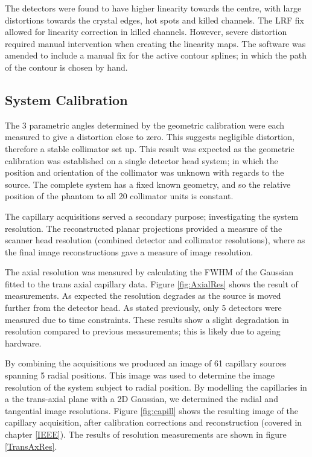 The detectors were found to have higher linearity towards the centre, with large distortions towards the crystal edges, hot spots and killed channels. The \acrshort{LRF} fix allowed for linearity correction in killed channels. However, severe distortion required manual intervention when creating the linearity maps. The software was amended to include a manual fix for the active contour splines; in which the path of the contour is chosen by hand. 

\subsection{System Calibration}
The 3 parametric angles determined by the geometric calibration were each measured to give a distortion close to zero. This suggests negligible distortion, therefore a stable collimator set up. This result was expected as the geometric calibration was established on a single detector head system; in which the position and orientation of the collimator was unknown with regards to the source. The complete system has a fixed known geometry, and so the relative position of the phantom to all 20 collimator units is constant. 

The capillary acquisitions served a secondary purpose; investigating the system resolution. The reconstructed planar projections provided a measure of the scanner head resolution (combined detector and collimator resolutions), where as the final image reconstructions gave a measure of image resolution. 

The axial resolution was measured by calculating the \acrshort{FWHM} of the Gaussian fitted to the trans axial capillary data. Figure \ref{fig:AxialRes} shows the result of measurements. As expected the resolution degrades as the source is moved further from the detector head. As stated previously, only 5 detectors were measured due to time constraints. These results show a slight degradation in resolution compared to previous measurements; this is likely due to ageing hardware. 

By combining the acquisitions we produced an image of 61 capillary
sources spanning 5 radial positions. This image was used to
determine the image resolution of the system subject to radial
position. By modelling the capillaries in a the trans-axial plane
with a 2D Gaussian, we determined the radial and tangential
image resolutions. Figure \ref{fig:capill} shows the resulting image of the capillary acquisition, after calibration corrections and reconstruction (covered in chapter \ref{IEEE}). The results of resolution measurements are shown in figure \ref{TransAxRes}. 

